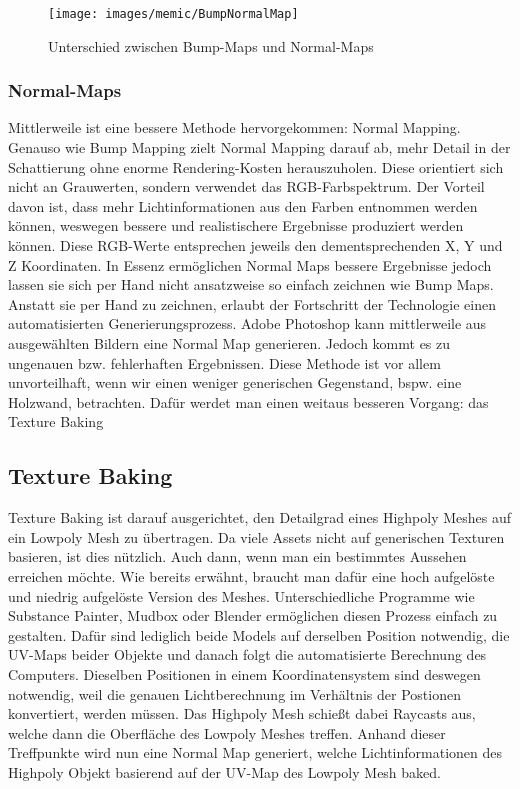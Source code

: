 \begin{figure}[H]
	\centering
	\texttt{[image: images/memic/BumpNormalMap]}
	\caption{Unterschied zwischen Bump-Maps und Normal-Maps}
\end{figure}
\cite{_bumpNormal}

\subsubsection{Normal-Maps}

Mittlerweile ist eine bessere Methode hervorgekommen: Normal Mapping. Genauso wie Bump Mapping zielt Normal Mapping darauf ab, mehr Detail in der Schattierung ohne enorme Rendering-Kosten herauszuholen. Diese orientiert sich nicht an Grauwerten, sondern verwendet das RGB-Farbspektrum. Der Vorteil davon ist, dass mehr Lichtinformationen aus den Farben entnommen werden können, weswegen bessere und realistischere Ergebnisse produziert werden können. Diese RGB-Werte entsprechen jeweils den dementsprechenden X, Y und Z Koordinaten. 
In Essenz ermöglichen Normal Maps bessere Ergebnisse jedoch lassen sie sich per Hand nicht ansatzweise so einfach zeichnen wie Bump Maps. Anstatt sie per Hand zu zeichnen, erlaubt der Fortschritt der Technologie einen automatisierten Generierungsprozess. Adobe Photoshop kann mittlerweile aus ausgewählten Bildern eine Normal Map generieren. Jedoch kommt es zu ungenauen bzw. fehlerhaften Ergebnissen. Diese Methode ist vor allem unvorteilhaft, wenn wir einen weniger generischen Gegenstand, bspw. eine Holzwand, betrachten. Dafür werdet man einen weitaus besseren Vorgang: das Texture Baking

\subsection{Texture Baking}
Texture Baking ist darauf ausgerichtet, den Detailgrad eines Highpoly Meshes auf ein Lowpoly Mesh zu übertragen. Da viele Assets nicht auf generischen Texturen basieren, ist dies nützlich. Auch dann, wenn man ein bestimmtes Aussehen erreichen möchte.\cite[8]{_highpoly_to_lowpoly} Wie bereits erwähnt, braucht man dafür eine hoch aufgelöste und niedrig aufgelöste Version des Meshes. Unterschiedliche Programme wie Substance Painter, Mudbox oder Blender ermöglichen diesen Prozess einfach zu gestalten. Dafür sind lediglich beide Models auf derselben Position notwendig, die UV-Maps beider Objekte und danach folgt die automatisierte Berechnung des Computers. Dieselben Positionen in einem Koordinatensystem sind deswegen notwendig, weil die genauen Lichtberechnung im Verhältnis der Postionen konvertiert, werden müssen. Das Highpoly Mesh schießt dabei Raycasts aus, welche dann die Oberfläche des Lowpoly Meshes treffen. Anhand dieser Treffpunkte wird nun eine Normal Map generiert, welche Lichtinformationen des Highpoly Objekt basierend auf der UV-Map des Lowpoly Mesh baked.

